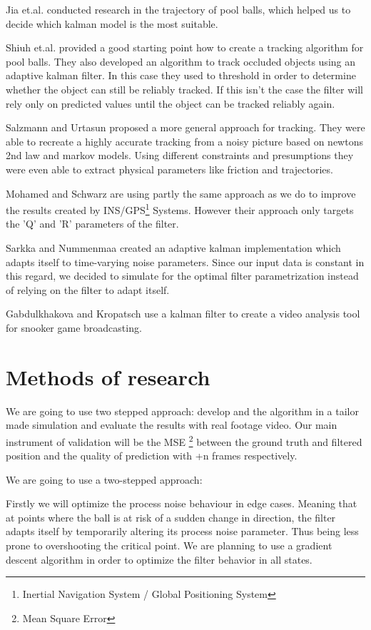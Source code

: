 \documentclass[titlepage, a4paper, 11pt]{scrartcl}
\begin{document}
    Jia et.al. \cite{jia} conducted research in the trajectory of pool balls, which helped us to decide which kalman model is the most suitable.

    Shiuh et.al. \cite{shiuh} provided a good starting point how to create a tracking algorithm for pool balls. They also developed an algorithm to track occluded objects using an adaptive kalman filter.
    In this case they used to threshold in order to determine whether the object can still be reliably tracked. If this isn't the case the filter will rely only on predicted values until the object can be tracked reliably again.

    Salzmann and Urtasun \cite{salzmann} proposed a more general approach for tracking. 
    They were able to recreate a highly accurate tracking from a noisy picture based on newtons 2nd law and markov models.
    Using different constraints and presumptions they were even able to extract physical parameters like friction and trajectories.

    Mohamed and Schwarz \cite{schwarz} are using partly the same approach as we do to improve the results created by INS/GPS\footnote{Inertial Navigation System / Global Positioning System} Systems.
    However their approach only targets the 'Q' and 'R' parameters of the filter.

    Sarkka and Nummenmaa \cite{sarkka} created an adaptive kalman implementation which adapts itself to time-varying noise parameters. Since our input data is constant in this regard,
    we decided to simulate for the optimal filter parametrization instead of relying on the filter to adapt itself.

    Gabdulkhakova and Kropatsch \cite{kropatsch} use a kalman filter to create a video analysis tool for snooker game broadcasting.

    \section{Methods of research}

    We are going to use two stepped approach: develop and the algorithm in a tailor made simulation
    and evaluate the results with real footage video. Our main instrument of validation will be the MSE
    \footnote{Mean Square Error} between the ground truth and filtered position and the quality of prediction
    with +n frames respectively.

    We are going to use a two-stepped approach: 
    
    Firstly we will optimize the process noise behaviour in edge cases. 
    Meaning that at points where the ball is at risk of a sudden change in direction, the filter adapts itself by temporarily altering its process noise parameter.
    Thus being less prone to overshooting the critical point.
    We are planning to use a gradient descent algorithm in order to optimize the filter behavior in all states.
\end{document}
